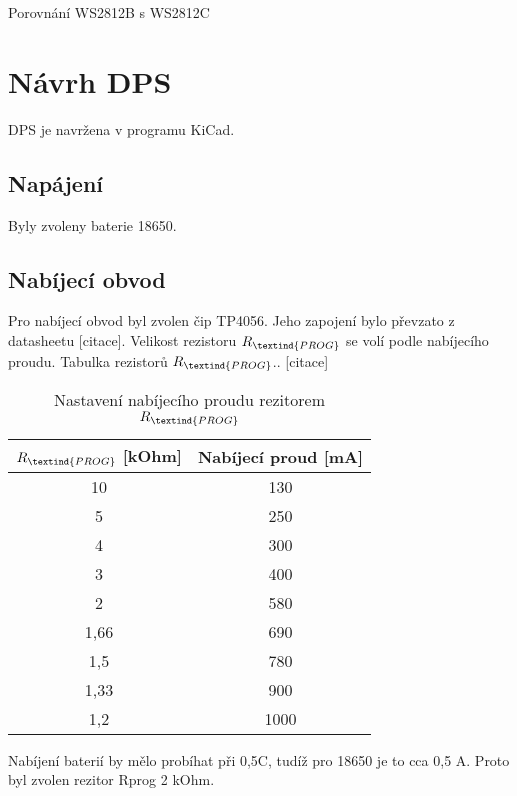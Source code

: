 Porovnání WS2812B s WS2812C

\chapter{Návrh DPS}
DPS je navržena v programu KiCad.

\section{Napájení}
Byly zvoleny baterie 18650.

\section{Nabíjecí obvod}
Pro nabíjecí obvod byl zvolen čip TP4056. Jeho zapojení bylo převzato z datasheetu [citace]. %
Velikost rezistoru $R_\textind{PROG}$ se volí podle nabíjecího proudu. 
Tabulka rezistorů $R_\textind{PROG}$.. [citace]

\begin{table}[!h]
    \caption{Nastavení nabíjecího proudu rezitorem $R_\textind{PROG}$}
    \begin{center}
        \begin{tabular}{|c|c|}
            \hline
            $R_\textind{PROG}$ [kOhm] & Nabíjecí proud [mA] \\
            \hline
            10      & 130 \\
            \hline
            5       & 250 \\
            \hline
            4       & 300 \\
            \hline
            3       & 400 \\
            \hline
            2       & 580 \\
            \hline
            1,66    & 690 \\
            \hline
            1,5     & 780 \\
            \hline
            1,33    & 900 \\
            \hline
            1,2     & 1000 \\
            \hline
        \end{tabular}
        
    \end{center}
\end{table}

Nabíjení baterií by mělo probíhat při 0,5C, tudíž pro 18650 je to cca 0,5 A. Proto byl zvolen rezitor Rprog 2 kOhm.

